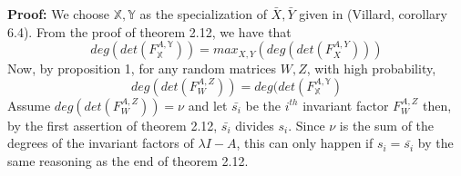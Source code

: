 \documentclass[12pt]{article}
\begin{document}
\noindent\textbf{Proof:} 
We choose $\mathbb{X},\mathbb{Y}$ as the specialization of $\bar{X},\bar{Y}$ given in (Villard, corollary 6.4). From the proof of theorem 2.12, we have that
$$ deg(det(F_{\mathbb{X}}^{A,\mathbb{Y}})) = max_{X,Y}(deg(det(F_X^{A,Y}))) $$
Now, by proposition 1, for any random matrices $W,Z$, with high probability,
$$ deg(det(F_W^{A,Z})) = deg(det(F_{\mathbb{X}}^{A,\mathbb{Y}})$$
Assume $deg(det(F_W^{A,Z})) = \nu$ and 
let $\bar{s_i}$ be the $i^{th}$ invariant factor $F_W^{A,Z}$ then, by the first assertion of theorem 2.12, $\bar{s_i}$ divides $s_i$. Since
$\nu$ is the sum of the degrees of the invariant factors of $\lambda I - A$, this can only happen if $s_i = \bar{s_i}$ by the same reasoning as the end of theorem 2.12.
\end{document}
